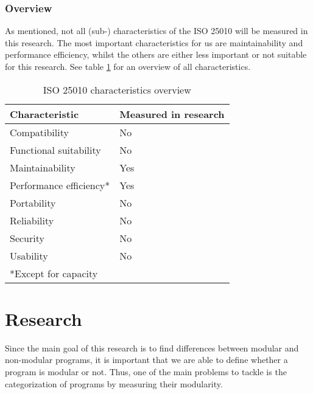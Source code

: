 \documentclass[twoside]{uva-inf-bachelor-thesis}
\begin{document}
\subsection{Overview}
As mentioned, not all (sub-) characteristics of the ISO 25010 will be measured in this research. The most important characteristics for us are maintainability and performance efficiency, whilst the others are either less important or not suitable for this research. See table \ref{table:overview} for an overview of all characteristics.

\begin{table}[H]
\centering
\caption{ISO 25010 characteristics overview}
\label{table:overview}
\begin{tabular}{ll}
\multicolumn{1}{l|}{\textbf{Characteristic}} & \textbf{Measured in research} \\ \hline
\multicolumn{1}{l|}{Compatibility}           & No                            \\
\multicolumn{1}{l|}{Functional suitability}  & No                            \\
\multicolumn{1}{l|}{Maintainability}         & Yes                           \\
\multicolumn{1}{l|}{Performance efficiency*} & Yes                           \\
\multicolumn{1}{l|}{Portability}             & No                            \\
\multicolumn{1}{l|}{Reliability}             & No                            \\
\multicolumn{1}{l|}{Security}                & No                            \\
\multicolumn{1}{l|}{Usability}               & No                            \\
*Except for capacity                         &                              
\end{tabular}
\end{table}

\chapter{Research}
Since the main goal of this research is to find differences between modular and non-modular programs, it is important that we are able to define whether a program is modular or not. Thus, one of the main problems to tackle is the categorization of programs by measuring their modularity.\\
\end{document}
